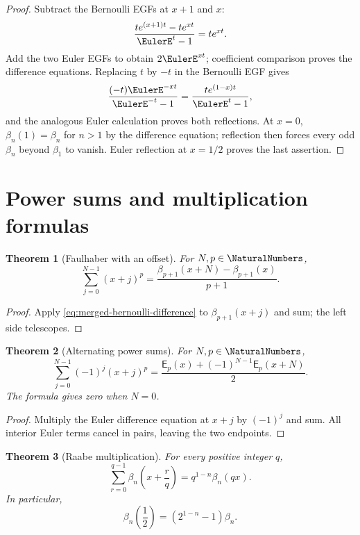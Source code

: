 \documentclass[11pt,a4paper,oneside,openany]{book}
\newtheorem{theorem}{Theorem}[chapter]
\theoremstyle{definition}
\theoremstyle{remark}
\begin{document}
\begin{proof}
Subtract the Bernoulli EGFs at $x+1$ and $x$:
\[
 \frac{te^{(x+1)t}-te^{xt}}{\EulerE^t-1}=te^{xt}.
\]
Add the two Euler EGFs to obtain $2\EulerE^{xt}$; coefficient comparison proves the
difference equations.  Replacing $t$ by $-t$ in the Bernoulli EGF gives
\[
 \frac{(-t)\EulerE^{-xt}}{\EulerE^{-t}-1}=\frac{te^{(1-x)t}}{\EulerE^t-1},
\]
and the analogous Euler calculation proves both reflections.  At $x=0$,
$\beta_n(1)=\beta_n$ for $n>1$ by the difference equation; reflection then
forces every odd $\beta_n$ beyond $\beta_1$ to vanish.  Euler reflection at
$x=1/2$ proves the last assertion.
\end{proof}

\section{Power sums and multiplication formulas}

\begin{theorem}[Faulhaber with an offset]
\label{thm:merged-faulhaber}
For $N,p\in\NaturalNumbers$,
\begin{equation}
 \sum_{j=0}^{N-1}(x+j)^p
 =\frac{\beta_{p+1}(x+N)-\beta_{p+1}(x)}{p+1}.                      \label{eq:merged-faulhaber}
\end{equation}
\end{theorem}

\begin{proof}
Apply \eqref{eq:merged-bernoulli-difference} to $\beta_{p+1}(x+j)$ and sum;
the left side telescopes.
\end{proof}

\begin{theorem}[Alternating power sums]
\label{thm:merged-alternating-sums}
For $N,p\in\NaturalNumbers$,
\begin{equation}
 \sum_{j=0}^{N-1}(-1)^j(x+j)^p
 =\frac{\mathsf E_p(x)+(-1)^{N-1}\mathsf E_p(x+N)}2.               \label{eq:merged-alternating-sums}
\end{equation}
The formula gives zero when $N=0$.
\end{theorem}

\begin{proof}
Multiply the Euler difference equation at $x+j$ by $(-1)^j$ and sum.  All
interior Euler terms cancel in pairs, leaving the two endpoints.
\end{proof}

\begin{theorem}[Raabe multiplication]
\label{thm:merged-raabe}
For every positive integer $q$,
\begin{equation}
 \sum_{r=0}^{q-1}\beta_n\!\left(x+\frac rq\right)
 =q^{1-n}\beta_n(qx).                                               \label{eq:merged-raabe}
\end{equation}
In particular,
\begin{equation}
 \beta_n\!\left(\frac12\right)=(2^{1-n}-1)\beta_n.                 \label{eq:merged-bernoulli-half}
\end{equation}
\end{theorem}
\end{document}
